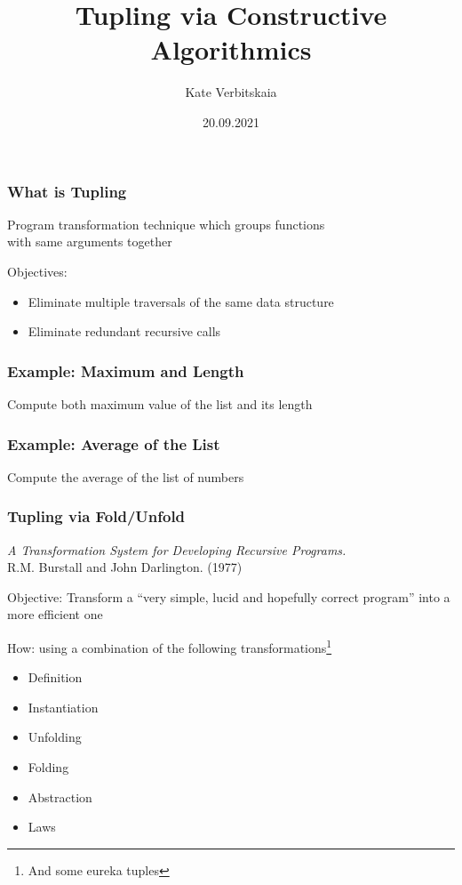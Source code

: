 \documentclass{beamer}
\title[]{Tupling via Constructive Algorithmics}
\subtitle[]{}
\institute[]{JetBrains Programming Languages and Tools Lab
}
\author[]{Kate Verbitskaia}
\date{20.09.2021}
\begin{document}
{
  \begin{frame}
    \titlepage
  \end{frame}
}


\begin{frame}[fragile]
  \frametitle{What is Tupling}
\begin{center}
  Program transformation technique which groups functions \\ with same arguments together
\end{center}

\vspace{1cm}

Objectives:
\begin{itemize}
  \item Eliminate multiple traversals of the same data structure
  \item Eliminate redundant recursive calls
\end{itemize}
\end{frame}

\begin{frame}[fragile]
  \frametitle{Example: Maximum and Length}
\begin{center}
  Compute both maximum value of the list and its length
\end{center}
\end{frame}

\begin{frame}[fragile]
  \frametitle{Example: Average of the List}
\begin{center}
  Compute the average of the list of numbers
\end{center}
\end{frame}

\begin{frame}[t]
  \frametitle{Tupling via Fold/Unfold}
\textit{A Transformation System for Developing Recursive Programs.} \\R.M. Burstall and John Darlington. (1977)

\vspace{0.6cm}

Objective: Transform a ``very simple, lucid and hopefully correct program'' into a more efficient one

\vspace{0.6cm}
How: using a combination of the following transformations\footnote{And some eureka tuples}
\begin{itemize}
  \item Definition
  \item Instantiation
  \item Unfolding
  \item Folding
  \item Abstraction
  \item Laws
\end{itemize}
\end{frame}
\end{document}
